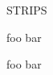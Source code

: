 

\begin{listofabbrv}{STRIPS}
    \item[foo] bar
\end{listofabbrv}

\begin{listofsymbols}{\hstar}
    \item[foo] bar
\end{listofsymbols}

